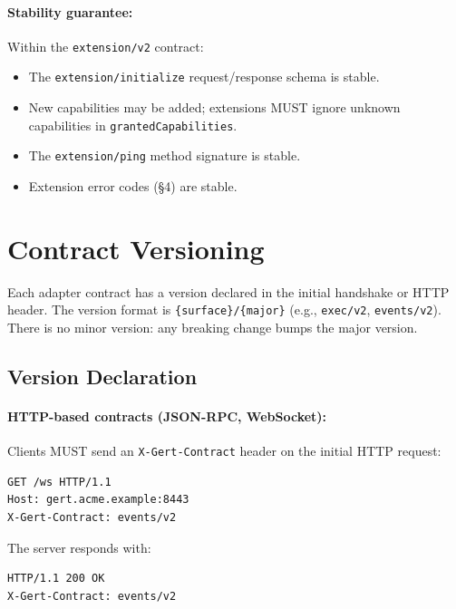\paragraph{Stability guarantee:}

Within the \texttt{extension/v2} contract:

\begin{itemize}
  \item The \texttt{extension/initialize} request/response schema is stable.
  \item New capabilities may be added; extensions MUST ignore unknown
        capabilities in \texttt{grantedCapabilities}.
  \item The \texttt{extension/ping} method signature is stable.
  \item Extension error codes (§4) are stable.
\end{itemize}

\section{Contract Versioning}
\label{sec:contract-versioning}

Each adapter contract has a version declared in the initial handshake or HTTP
header.  The version format is \texttt{\{surface\}/\{major\}} (e.g.,
\texttt{exec/v2}, \texttt{events/v2}).  There is no minor version: any breaking
change bumps the major version.

\subsection{Version Declaration}

\paragraph{HTTP-based contracts (JSON-RPC, WebSocket):}

Clients MUST send an \texttt{X-Gert-Contract} header on the initial HTTP
request:

\begin{verbatim}
GET /ws HTTP/1.1
Host: gert.acme.example:8443
X-Gert-Contract: events/v2
\end{verbatim}

The server responds with:

\begin{verbatim}
HTTP/1.1 200 OK
X-Gert-Contract: events/v2
\end{verbatim}


